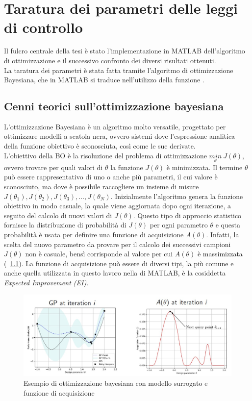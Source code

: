 \chapter{Taratura dei parametri delle leggi di controllo}
\label{cha:1}
Il fulcro centrale della tesi è stato l'implementazione in MATLAB dell'algoritmo di ottimizzazione e il successivo confronto dei diversi risultati ottenuti.\\
La taratura dei parametri è stata fatta tramite l'algoritmo di ottimizzazione Bayesiana, che in \nobreakdash MATLAB si traduce nell'utilizzo della funzione \cite{bayesopt}.

\section{Cenni teorici sull'ottimizzazione bayesiana}
L'ottimizzazione Bayesiana è un algoritmo molto versatile, progettato per ottimizzare modelli a scatola nera, ovvero sistemi dove l'espressione analitica della funzione obiettivo è sconosciuta, così come le sue derivate.\\
L'obiettivo della BO è la risoluzione del problema di ottimizzazione $\underset{\theta}{min} \ J(\theta)$, ovvero trovare per quali valori di $\theta$ la funzione $J(\theta)$ è minimizzata. Il termine $\theta$ può essere rappresentativo di uno o anche più parametri, il cui valore è sconosciuto, ma dove è possibile raccogliere un insieme di misure $J(\theta_1), J(\theta_2), J(\theta_3), \dots, J(\theta_N)$. Inizialmente l'algoritmo genera la funzione obiettivo in modo casuale, la quale viene aggiornata dopo ogni iterazione, a seguito del calcolo di nuovi valori di $J(\theta)$. Questo tipo di approccio statistico fornisce la distribuzione di probabilità di $J(\theta)$ per ogni parametro $\theta$ e questa probabilità è usata per definire una funzione di acquisizione $A(\theta)$. Infatti, la scelta del nuovo parametro da provare per il calcolo dei successivi campioni $J(\theta)$ non è casuale, bensì corrisponde al valore per cui $A(\theta)$ è massimizzata (\figurename \ \ref{fig:BO}). La funzione di acquisizione può essere di diversi tipi, la più comune e anche quella utilizzata in questo lavoro nella \cite{bayesopt} di MATLAB, è la cosiddetta \textit{Expected Improvement (EI)}.\\
\begin{figure}[htb]
	\centering
	\includegraphics[scale=0.6]{figure/BO.jpg}
	\caption{Esempio di ottimizzazione bayesiana con modello surrogato e funzione di acquisizione}
	\label{fig:BO}
\end{figure}


